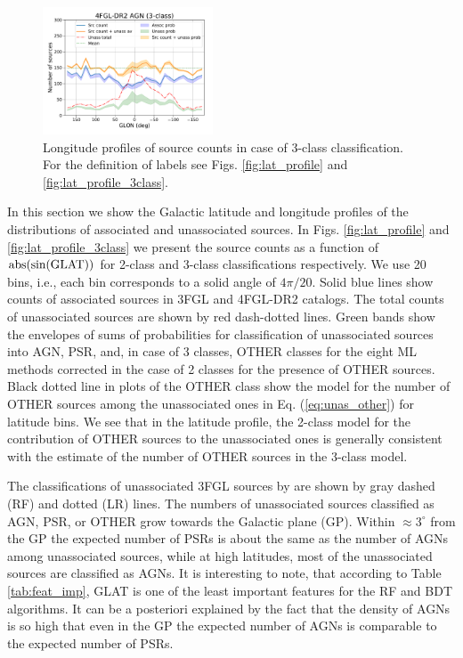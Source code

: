 \begin{figure}[h]
\includegraphics[width=0.45\textwidth]{plots/lon_profile_AGN_4FGL-DR2_3classes.pdf}
\caption{Longitude profiles of source counts in case of 3-class classification. For the definition of labels see Figs. \ref{fig:lat_profile} and \ref{fig:lat_profile_3class}.}  
\label{fig:lon_profile_3class}
\end{figure}


In this section we show the Galactic latitude and longitude profiles of the distributions of associated and unassociated sources.
In Figs. \ref{fig:lat_profile} and \ref{fig:lat_profile_3class} we present the source counts as a function of ${\rm abs(sin(GLAT))}$ 
for 2-class and 3-class classifications respectively.
We use 20 bins, i.e., each bin corresponds to a solid angle of $4 \pi / 20$. 
Solid blue lines show counts of associated sources in 3FGL and 4FGL-DR2  catalogs.
The total counts of unassociated sources are shown by red dash-dotted lines.
Green bands show the envelopes of sums of probabilities for classification of unassociated sources into AGN, PSR, and, in case of 3 classes, OTHER classes for the eight ML methods corrected in the case of 2 classes for the presence of OTHER sources.
Black dotted line in plots of the OTHER class show the model for the number of OTHER sources among the unassociated ones
in Eq. (\ref{eq:unas_other}) for latitude bins.
We see that in the latitude profile, the 2-class model for the contribution of OTHER sources to the unassociated ones is generally consistent with the estimate of the number of OTHER sources in the 3-class model.

The classifications of unassociated 3FGL sources by \cite{2016ApJ...820....8S} are shown by gray dashed (RF) and dotted (LR) lines.
The numbers of unassociated sources classified as AGN, PSR, or OTHER grow towards the Galactic plane (GP).
Within $\approx 3^\circ$ from the GP the expected number of PSRs is about the same as the number of AGNs among unassociated sources, while at high latitudes, most of the unassociated sources are classified as AGNs.
It is interesting to note, that according to Table \ref{tab:feat_imp}, GLAT is one of the least important features for the RF and BDT algorithms.
It can be a posteriori explained by the fact that the density of AGNs is so high that even in the GP the expected number of AGNs is comparable to the expected number of PSRs.

